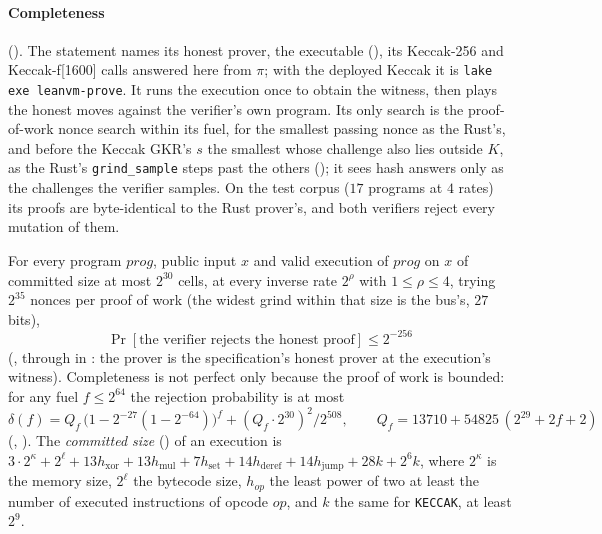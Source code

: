 \documentclass[11pt]{article}
\begin{document}
\paragraph{Completeness} (). The statement names its honest prover,
the executable 
(), its Keccak-256 and Keccak-f[1600] calls answered here from $\pi$; with
the deployed Keccak it is \texttt{lake exe leanvm-prove}. It runs the execution once to obtain the
witness, then plays the honest moves against the verifier's own program. Its only search is the
proof-of-work nonce search within its fuel, for the smallest passing nonce as the Rust's, and
before the Keccak GKR's $s$ the smallest whose challenge also lies outside $K$, as the Rust's
\texttt{grind\_sample} steps past the others (); it sees hash answers only
as the challenges the verifier samples. On the test corpus ($17$ programs at $4$ rates) its proofs are byte-identical to
the Rust prover's, and both verifiers reject every mutation of them.

For every program $\mathit{prog}$, public input $x$ and valid execution of $\mathit{prog}$ on $x$ of committed size at
most $2^{30}$ cells, at every inverse rate $2^\rho$ with $1 \le \rho \le 4$, trying $2^{35}$ nonces
per proof of work (the widest grind within that size is the bus's, $27$ bits),
\[
\boxed{\ \Pr[\text{the verifier rejects the honest proof}] \le 2^{-256}\ }
\]
(, through  in : the prover is the
specification's honest prover at the execution's witness). Completeness is not perfect only
because the proof of work is bounded: for any fuel $f \le 2^{64}$ the rejection probability is at
most
\[
\delta(f) = Q_f\,\bigl(1-2^{-27}(1-2^{-64})\bigr)^{f} + (Q_f\cdot 2^{30})^2/2^{508}, \qquad
Q_f = 13710 + 54825\,(2^{29} + 2f + 2)
\]
(, ). The \emph{committed size} () of an
execution is
$3\cdot 2^{\kappa} + 2^{\ell} + 13h_{\mathrm{xor}} + 13h_{\mathrm{mul}} + 7h_{\mathrm{set}} +
14h_{\mathrm{deref}} + 14h_{\mathrm{jump}} + 28k + 2^6 k$, where $2^\kappa$ is the memory size,
$2^\ell$ the bytecode size, $h_{op}$ the least power of two at least the number of executed
instructions of opcode $op$, and $k$ the same for \texttt{KECCAK}, at least $2^9$.
\end{document}
